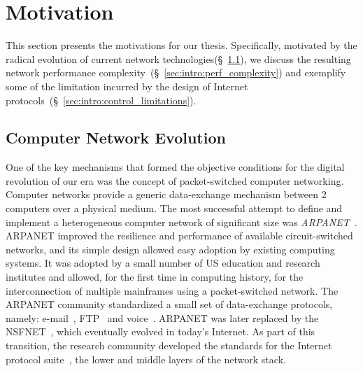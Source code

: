 \section{Motivation} \label{sec:intro:motivations}

This section presents the motivations for our thesis. Specifically, motivated by
the radical evolution of current network
technologies(\S~\ref{sec:intro:net_evolution}), we discuss the resulting network
performance complexity~(\S~\ref{sec:intro:perf_complexity}) and exemplify some
of the limitation incurred by the design of Internet
protocols~(\S~\ref{sec:intro:control_limitations}).

\subsection{Computer Network Evolution}\label{sec:intro:net_evolution}

One of the key mechanisms that formed the objective conditions for the digital
revolution of our era was the concept of packet-switched computer networking.
Computer networks provide a generic data-exchange mechanism between 2 computers
over a physical medium.  The most successful attempt to define and implement a
heterogeneous computer network of significant size was
\textit{ARPANET}~. ARPANET improved the resilience and
performance of available circuit-switched networks, and its simple design
allowed easy adoption by existing computing systems.  It was adopted by a small
number of US education and research institutes and allowed, for the first time
in computing history, for the interconnection of multiple mainframes using a
packet-switched network. The ARPANET community standardized a small set of
data-exchange protocols, namely: e-mail~, FTP~
and voice~. ARPANET was later replaced by the
NSFNET~, which eventually evolved in today's Internet.  As
part of this transition, the research community developed the standards for the
Internet protocol suite~, the
lower and middle layers of the network stack.

